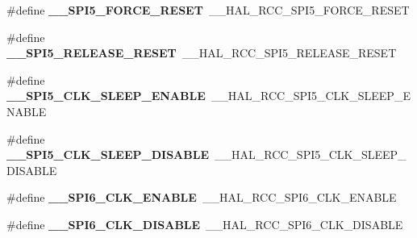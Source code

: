 \begin{DoxyCompactItemize}
\item 
\mbox{\label{group___h_a_l___r_c_c___aliased_ga58137bdc1c2d10e75f0da96c677e8ead}} 
\#define {\bfseries \+\_\+\+\_\+\+S\+P\+I5\+\_\+\+F\+O\+R\+C\+E\+\_\+\+R\+E\+S\+ET}~\+\_\+\+\_\+\+H\+A\+L\+\_\+\+R\+C\+C\+\_\+\+S\+P\+I5\+\_\+\+F\+O\+R\+C\+E\+\_\+\+R\+E\+S\+ET
\item 
\mbox{\label{group___h_a_l___r_c_c___aliased_gabca42c543de06ceaad91178e82cc33de}} 
\#define {\bfseries \+\_\+\+\_\+\+S\+P\+I5\+\_\+\+R\+E\+L\+E\+A\+S\+E\+\_\+\+R\+E\+S\+ET}~\+\_\+\+\_\+\+H\+A\+L\+\_\+\+R\+C\+C\+\_\+\+S\+P\+I5\+\_\+\+R\+E\+L\+E\+A\+S\+E\+\_\+\+R\+E\+S\+ET
\item 
\mbox{\label{group___h_a_l___r_c_c___aliased_gabbaf71d9b0e2f5d88c3563747d53fc4b}} 
\#define {\bfseries \+\_\+\+\_\+\+S\+P\+I5\+\_\+\+C\+L\+K\+\_\+\+S\+L\+E\+E\+P\+\_\+\+E\+N\+A\+B\+LE}~\+\_\+\+\_\+\+H\+A\+L\+\_\+\+R\+C\+C\+\_\+\+S\+P\+I5\+\_\+\+C\+L\+K\+\_\+\+S\+L\+E\+E\+P\+\_\+\+E\+N\+A\+B\+LE
\item 
\mbox{\label{group___h_a_l___r_c_c___aliased_ga8ad5af0156ecf5b7fb04992a241103ed}} 
\#define {\bfseries \+\_\+\+\_\+\+S\+P\+I5\+\_\+\+C\+L\+K\+\_\+\+S\+L\+E\+E\+P\+\_\+\+D\+I\+S\+A\+B\+LE}~\+\_\+\+\_\+\+H\+A\+L\+\_\+\+R\+C\+C\+\_\+\+S\+P\+I5\+\_\+\+C\+L\+K\+\_\+\+S\+L\+E\+E\+P\+\_\+\+D\+I\+S\+A\+B\+LE
\item 
\mbox{\label{group___h_a_l___r_c_c___aliased_gaeaff69ae659f6a4c17e27b80ef8a80bc}} 
\#define {\bfseries \+\_\+\+\_\+\+S\+P\+I6\+\_\+\+C\+L\+K\+\_\+\+E\+N\+A\+B\+LE}~\+\_\+\+\_\+\+H\+A\+L\+\_\+\+R\+C\+C\+\_\+\+S\+P\+I6\+\_\+\+C\+L\+K\+\_\+\+E\+N\+A\+B\+LE
\item 
\mbox{\label{group___h_a_l___r_c_c___aliased_ga52970a8cdb4096533a1ca3221f3464d9}} 
\#define {\bfseries \+\_\+\+\_\+\+S\+P\+I6\+\_\+\+C\+L\+K\+\_\+\+D\+I\+S\+A\+B\+LE}~\+\_\+\+\_\+\+H\+A\+L\+\_\+\+R\+C\+C\+\_\+\+S\+P\+I6\+\_\+\+C\+L\+K\+\_\+\+D\+I\+S\+A\+B\+LE
\item 
\mbox{\label{group___h_a_l___r_c_c___aliased_ga949e3288b4d1c612cd52f79baa120bcd}} 

\end{DoxyCompactItemize}
